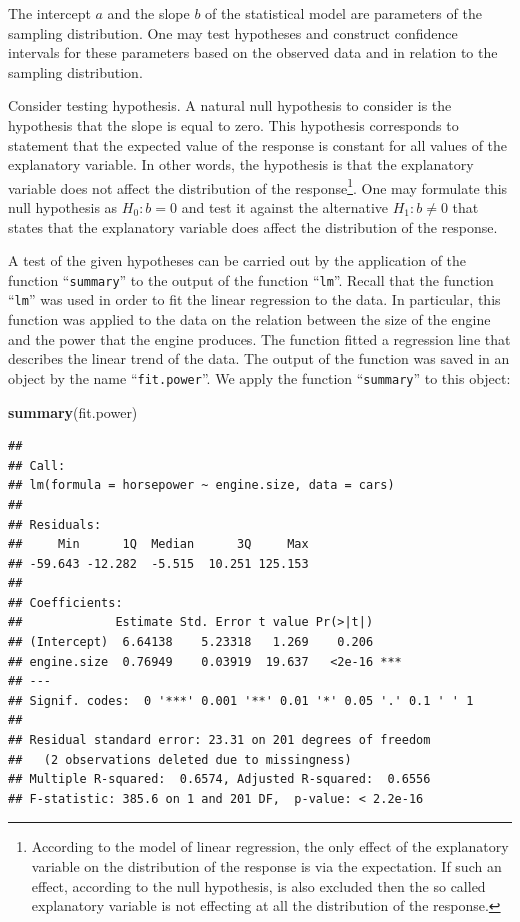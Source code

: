 \documentclass[
]{krantz}
\makeatletter
\newenvironment{Shaded}{\begin{snugshade}}{\end{snugshade}}
\newcommand{\KeywordTok}[1]{\textcolor[rgb]{0.13,0.29,0.53}{\textbf{#1}}}
\newcommand{\NormalTok}[1]{#1}
\newenvironment{kframe}{%
\medskip{}
\setlength{\fboxsep}{.8em}
 \def\at@end@of@kframe{}%
 \ifinner\ifhmode%
  \def\at@end@of@kframe{\end{minipage}}%
  \begin{minipage}{\columnwidth}%
 \fi\fi%
 \def\FrameCommand##1{\hskip\@totalleftmargin \hskip-\fboxsep
 \colorbox{shadecolor}{##1}\hskip-\fboxsep
     \hskip-\linewidth \hskip-\@totalleftmargin \hskip\columnwidth}%
 \MakeFramed {\advance\hsize-\width
   \@totalleftmargin\z@ \linewidth\hsize
   \@setminipage}}%
 {\par\unskip\endMakeFramed%
 \at@end@of@kframe}
\renewenvironment{Shaded}{\begin{kframe}}{\end{kframe}}
\theoremstyle{definition}
\theoremstyle{definition}
\theoremstyle{definition}
\theoremstyle{remark}
\makeatother
\begin{document}
The intercept \(a\) and the slope \(b\) of the statistical model are
parameters of the sampling distribution. One may test hypotheses and
construct confidence intervals for these parameters based on the
observed data and in relation to the sampling distribution.

Consider testing hypothesis. A natural null hypothesis to consider is
the hypothesis that the slope is equal to zero. This hypothesis
corresponds to statement that the expected value of the response is
constant for all values of the explanatory variable. In other words, the
hypothesis is that the explanatory variable does not affect the
distribution of the response\footnote{According to the model of linear regression, the only effect of
  the explanatory variable on the distribution of the response is via
  the expectation. If such an effect, according to the null
  hypothesis, is also excluded then the so called explanatory variable
  is not effecting at all the distribution of the response.}. One may formulate this null hypothesis
as \(H_0:b = 0\) and test it against the alternative \(H_1: b \not= 0\) that
states that the explanatory variable does affect the distribution of the
response.

A test of the given hypotheses can be carried out by the application of
the function ``\texttt{summary}'' to the output of the function ``\texttt{lm}''. Recall
that the function ``\texttt{lm}'' was used in order to fit the linear regression
to the data. In particular, this function was applied to the data on the
relation between the size of the engine and the power that the engine
produces. The function fitted a regression line that describes the
linear trend of the data. The output of the function was saved in an
object by the name ``\texttt{fit.power}''. We apply the function ``\texttt{summary}'' to
this object:

\begin{Shaded}
\begin{Highlighting}[]
\KeywordTok{summary}\NormalTok{(fit.power)}
\end{Highlighting}
\end{Shaded}

\begin{verbatim}
## 
## Call:
## lm(formula = horsepower ~ engine.size, data = cars)
## 
## Residuals:
##     Min      1Q  Median      3Q     Max 
## -59.643 -12.282  -5.515  10.251 125.153 
## 
## Coefficients:
##             Estimate Std. Error t value Pr(>|t|)    
## (Intercept)  6.64138    5.23318   1.269    0.206    
## engine.size  0.76949    0.03919  19.637   <2e-16 ***
## ---
## Signif. codes:  0 '***' 0.001 '**' 0.01 '*' 0.05 '.' 0.1 ' ' 1
## 
## Residual standard error: 23.31 on 201 degrees of freedom
##   (2 observations deleted due to missingness)
## Multiple R-squared:  0.6574, Adjusted R-squared:  0.6556 
## F-statistic: 385.6 on 1 and 201 DF,  p-value: < 2.2e-16
\end{verbatim}
\end{document}
